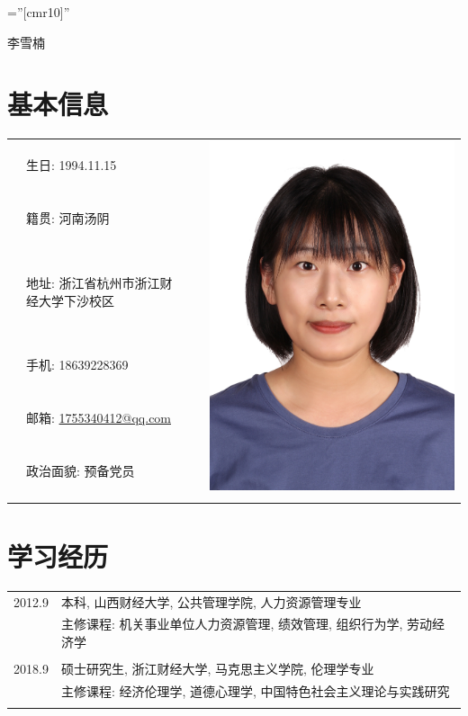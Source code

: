 \documentclass[a4paper,11pt]{article}
\begin{document}

\pagestyle{empty} %

\font\fb=''[cmr10]'' %

\par{
		\begin{center}{\Huge 李雪楠
	}\end{center}

\par}

\section{基本信息}

\begin{tabular}{rlrr}
  &生日: 1994.11.15 & \quad\quad\quad\quad\quad\quad\quad\quad & \multirow{6}{*}{\includegraphics[width=0.18  \textwidth]{baby.jpg}}\\
  &籍贯: 河南汤阴 \\
  &地址: 浙江省杭州市浙江财经大学下沙校区\\
  &手机: 18639228369\\
  &邮箱: \href{mailto:1755340412@qq.com}{1755340412@qq.com}\\
  &政治面貌: 预备党员\\
  \\
\end{tabular}



\section{学习经历}
\begin{tabular}{rl}
\textsc{2012.9} & 本科, 山西财经大学, 公共管理学院, 人力资源管理专业\\
& 主修课程: 机关事业单位人力资源管理, 绩效管理, 组织行为学, 劳动经济学\\&\\
\textsc{2018.9} & 硕士研究生, 浙江财经大学, 马克思主义学院, 伦理学专业\\
& 主修课程: 经济伦理学, 道德心理学, 中国特色社会主义理论与实践研究\\&\\
\end{tabular}
\end{document}

